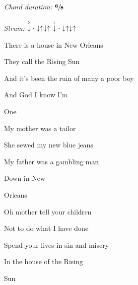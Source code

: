 \begin{song}



\textit{Chord duration: $\mathbf{\sfrac{6}{8}}$}

\textit{Strum:} $\AccentDown\Miss\Down\Up\Down\Up\ \AccentDown\Miss\Down\Up\Down\Up$

\large


\bigskip

    \par
{}    \par

\bigskip

There is a house in New Orleans  \par
They call the Rising Sun  \par
And it’s been the ruin of many a poor boy  \par
And God I know I’m \par
{}One    \par
{}    \par

\bigskip

My mother was a tailor  \par
She sewed my new blue jeans  \par
My father was a gambling man \par
{}Down in New \par
Orleans    \par
{}    \par

\bigskip

Oh mother  tell your children  \par
Not to do what I have done  \par
{}Spend your lives in sin and misery \par
In the house of the Rising \par
{}Sun    \par
{}    \par


\end{song}
